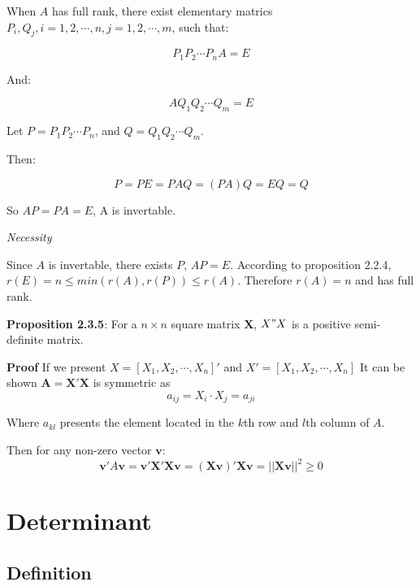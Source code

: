 \documentclass{article}
\newcommand{\V}[1]{\boldsymbol{#1}}
\begin{document}
When \(A\) has full rank, there exist elementary matrics
\(P_i, Q_j, i = 1, 2, \cdots, n, j=1,2,\cdots,m\), such that:

\begin{equation}
    P_1P_2\cdots P_nA = E
\end{equation}

And:

\begin{equation}
    AQ_1Q_2\cdots Q_m = E
\end{equation}

Let \(P=P_1P_2\cdots P_n\), and \(Q=Q_1Q_2\cdots Q_m\).

Then:

\begin{equation}
P=PE=PAQ=(PA)Q=EQ=Q
\end{equation}

So \(AP=PA=E\), A is invertable.

\vspace{2mm}

\textit{Necessity}

Since \(A\) is invertable, there exists \(P\), \(AP=E\).
According to proposition 2.2.4, \(r(E)=n\leq min(r(A), r(P))\leq r(A)\).
Therefore \(r(A)=n\) and has full rank.

\vspace{2mm}
\textbf{Proposition 2.3.5}: For a \(n \times n\) square matrix \(\mathbf{X}\),
\(X"X\) is a positive semi-definite matrix.

\vspace{2mm}
\textbf{Proof}
If we present \(X=[X_1, X_2, \cdots, X_n]'\) and
\(X'=[X_1, X_2, \cdots, X_n]\)
It can be shown \(\mathbf{A}=\mathbf{X}'\mathbf{X}\) is symmetric as
\begin{equation}
   a_{ij}=X_i \cdot X_j =a_{ji}
\end{equation}

Where \(a_{kl}\) presents the element located in the \(k\)th row and \(l\)th column
of \(A\).

Then for any non-zero vector \(\V{v}\):
\begin{equation}
\V{v}'A\V{v}=\V{v}'\mathbf{X}'\mathbf{X}\V{v}=(\mathbf{X}\V{v})'\mathbf{X}\V{v}
=||\mathbf{X}\V{v}||^2\geq 0
\end{equation}

\section{Determinant}

\subsection{Definition}
\end{document}
